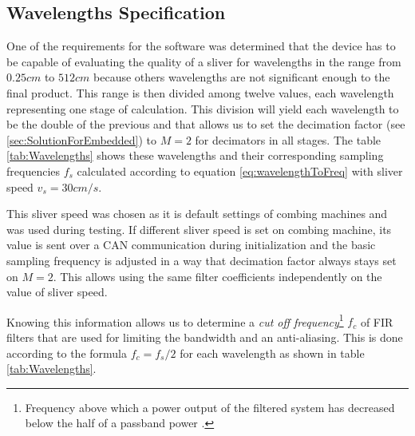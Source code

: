 \documentclass[twoside]{ctuthesis}
\theoremstyle{plain}
\theoremstyle{definition}
\theoremstyle{note}
\begin{document}
\subsection{Wavelengths Specification}
\label{sec:WavelengthSpecification}
One of the requirements for the software was determined that the device has to be capable of evaluating the quality of a sliver for wavelengths in the range from $0.25 cm$ to $512 cm$ because others wavelengths are not significant enough to the final product. This range is then divided among twelve values, each wavelength representing one stage of calculation. This division will yield each wavelength to be the double of the previous and that allows us to set the decimation factor (see \ref{sec:SolutionForEmbedded}) to $M=2$ for decimators in all stages. The table \ref{tab:Wavelengths} shows these wavelengths and their corresponding sampling frequencies $f_s$ calculated according to equation \ref{eq:wavelengthToFreq} with sliver speed $v_{s}=30 cm/s$. 

This sliver speed was chosen as it is default settings of combing machines and was used during testing. If different sliver speed is set on combing machine, its value is sent over a CAN communication during initialization and the basic sampling frequency is adjusted in a way that decimation factor always stays set on $M=2$. This allows using the same filter coefficients independently on the value of sliver speed.

Knowing this information allows us to determine a \textit{cut off frequency}\footnote{Frequency above which a power output of the filtered system has decreased below the half of a passband power \cite{cite:RT_DSP}.} $f_c$ of FIR filters that are used for limiting the bandwidth and an anti-aliasing. This is done according to the formula $f_c=f_s/2$ for each wavelength as shown in table \ref{tab:Wavelengths}.
\end{document}
